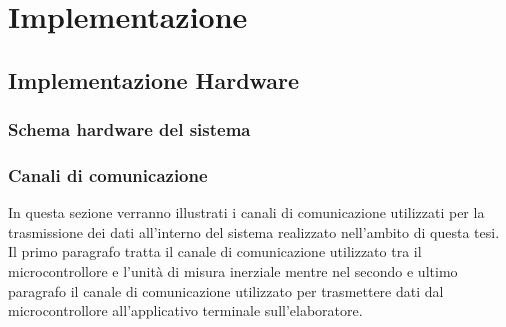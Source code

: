 \chapter{Implementazione}
\label{implementazione}

\section{Implementazione Hardware}

\subsection{Schema hardware del sistema}



\subsection{Canali di comunicazione}
In questa sezione verranno illustrati i canali di comunicazione utilizzati per la trasmissione dei dati all'interno del sistema realizzato nell'ambito di questa tesi. Il primo paragrafo tratta il canale di comunicazione utilizzato tra il microcontrollore e l'unità di misura inerziale mentre nel secondo e ultimo paragrafo il canale di comunicazione utilizzato per trasmettere dati dal microcontrollore all'applicativo terminale sull'elaboratore.
